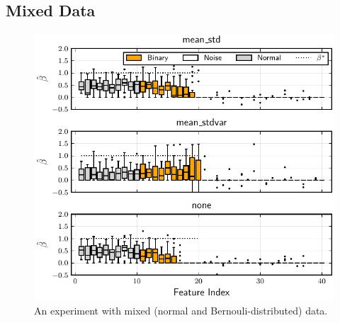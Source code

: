 \subsection{Mixed Data}

\begin{figure}[htpb]
  \centering
  \includegraphics[]{plots/mixed_data.pdf}
  \caption{%
    An experiment with mixed (normal and Bernouli-distributed) data.
  }
  \label{fig:mixed-data}
\end{figure}


\printbibliography



